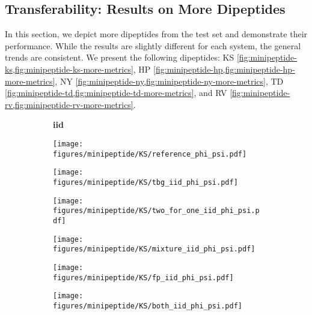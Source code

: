 \subsection{Transferability: Results on More Dipeptides} \label{appx:results-on-more-dipeptides}
In this section, we depict more dipeptides from the test set and demonstrate their performance. While the results are slightly different for each system, the general trends are consistent. We present the following dipeptides: KS \cref{fig:minipeptide-ks,fig:minipeptide-ks-more-metrics}, HP \cref{fig:minipeptide-hp,fig:minipeptide-hp-more-metrics}, NY \cref{fig:minipeptide-ny,fig:minipeptide-ny-more-metrics}, TD \cref{fig:minipeptide-td,fig:minipeptide-td-more-metrics}, and RV \cref{fig:minipeptide-rv,fig:minipeptide-rv-more-metrics}.

\begin{figure}
    \begin{minipage}{\textwidth}
        \begin{subfigure}[c]{0.05\textwidth}
        \vspace{-0.2cm}
            \textbf{iid}
        \end{subfigure}
        \begin{subfigure}[c]{0.15\textwidth}
            \centering
            \texttt{[image: figures/minipeptide/KS/reference\_phi\_psi.pdf]}
        \end{subfigure}
        \begin{subfigure}[c]{0.15\textwidth}
            \centering
            \texttt{[image: figures/minipeptide/KS/tbg\_iid\_phi\_psi.pdf]}
        \end{subfigure}
        \begin{subfigure}[c]{0.15\textwidth}
            \centering
            \texttt{[image: figures/minipeptide/KS/two\_for\_one\_iid\_phi\_psi.pdf]}
        \end{subfigure}
        \begin{subfigure}[c]{0.15\textwidth}
            \centering
            \texttt{[image: figures/minipeptide/KS/mixture\_iid\_phi\_psi.pdf]}
        \end{subfigure}
        \begin{subfigure}[c]{0.15\textwidth}
            \centering
            \texttt{[image: figures/minipeptide/KS/fp\_iid\_phi\_psi.pdf]}
        \end{subfigure}
        \begin{subfigure}[c]{0.15\textwidth}
            \centering
            \texttt{[image: figures/minipeptide/KS/both\_iid\_phi\_psi.pdf]}         
        \end{subfigure}
    \end{minipage}


\end{figure}

